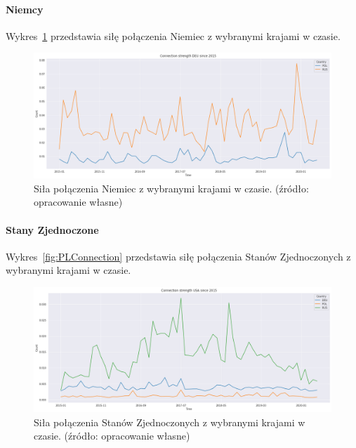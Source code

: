\documentclass[11pt]{report}
\begin{document}
    \paragraph{Niemcy}

    Wykres~\ref{fig:DEUConnection} przedstawia siłę połączenia Niemiec z wybranymi krajami w czasie.

    \begin{figure}[!htp]
        \centering
        \includegraphics[width=1 \textwidth]{fig/DEU/DEUConnection.png}
        \caption{Siła połączenia Niemiec z wybranymi krajami w czasie. (źródło: opracowanie własne)}
        \label{fig:DEUConnection}
    \end{figure}

    \paragraph{Stany Zjednoczone}

    Wykres~\ref{fig:PLConnection} przedstawia siłę połączenia Stanów Zjednoczonych z wybranymi krajami w czasie.

    \begin{figure}[!htp]
        \centering
        \includegraphics[width=1 \textwidth]{fig/USA/USAConnection.png}
        \caption{Siła połączenia Stanów Zjednoczonych z wybranymi krajami w czasie. (źródło: opracowanie własne)}
        \label{fig:USAConnection}
    \end{figure}
\end{document}
